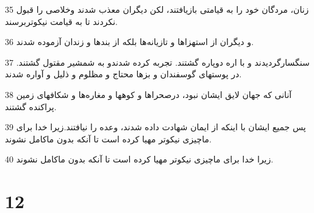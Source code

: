 \par 35 زنان، مردگان خود را به قیامتی باز‌یافتند، لکن دیگران معذب شدند وخلاصی را قبول نکردند تا به قیامت نیکوتربرسند.
\par 36 و دیگران از استهزاها و تازیانه‌ها بلکه از بندها و زندان آزموده شدند.
\par 37 سنگسارگردیدند و با اره دوپاره گشتند. تجربه کرده شدندو به شمشیر مقتول گشتند. در پوستهای گوسفندان و بزها محتاج و مظلوم و ذلیل و آواره شدند.
\par 38 آنانی که جهان لایق ایشان نبود، درصحراها و کوهها و مغاره‌ها و شکافهای زمین پراکنده گشتند.
\par 39 پس جمیع ایشان با اینکه از ایمان شهادت داده شدند، وعده را نیافتند.زیرا خدا برای ماچیزی نیکوتر مهیا کرده است تا آنکه بدون ماکامل نشوند.
\par 40 زیرا خدا برای ماچیزی نیکوتر مهیا کرده است تا آنکه بدون ماکامل نشوند.

\chapter{12}

